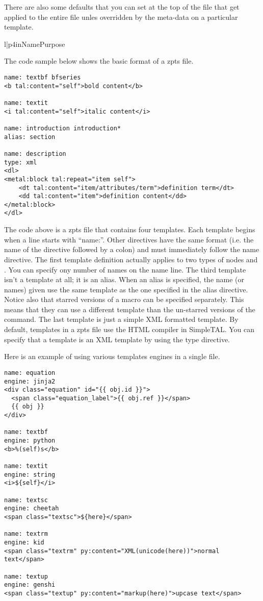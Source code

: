 There are also some defaults that you can set at the top of the file that
get applied to the entire file unles overridden by the meta-data on a 
particular template.
\begin{tableii}{l|p{4in}}{}{Name}{Purpose}
\end{tableii}

The code sample below shows the basic format of a zpts file.
\begin{verbatim}
name: textbf bfseries
<b tal:content="self">bold content</b>

name: textit
<i tal:content="self">italic content</i>

name: introduction introduction*
alias: section

name: description
type: xml
<dl>
<metal:block tal:repeat="item self">
    <dt tal:content="item/attributes/term">definition term</dt>
    <dd tal:content="item">definition content</dd>
</metal:block>
</dl>
\end{verbatim}

The code above is a zpts file that contains four templates.  Each template
begins when a line starts with ``name:''.  Other directives have the same
format (i.e. the name of the directive followed by a colon) and must 
immediately follow the name directive.  The first template definition 
actually applies to two types of nodes  and .
You can specify ony number of names on the name line.  The third template
isn't a template at all; it is an alias.  When an alias is specified,
the name (or names) given use the same template as the one specified 
in the alias directive.  Notice also that starred versions of a macro
can be specified separately.  This means that they can use a different
template than the un-starred versions of the command.
The last template is just a simple XML formatted
template.  By default, templates in a zpts file use the HTML compiler
in SimpleTAL.  You can specify that a template is an XML template by using
the type directive.

Here is an example of using various templates engines in a single file.
\begin{verbatim}
name: equation
engine: jinja2
<div class="equation" id="{{ obj.id }}">
  <span class="equation_label">{{ obj.ref }}</span>
  {{ obj }}
</div>

name: textbf
engine: python
<b>%(self)s</b>

name: textit
engine: string
<i>${self}</i>

name: textsc
engine: cheetah
<span class="textsc">${here}</span>

name: textrm
engine: kid
<span class="textrm" py:content="XML(unicode(here))">normal text</span>

name: textup
engine: genshi
<span class="textup" py:content="markup(here)">upcase text</span>
\end{verbatim}


